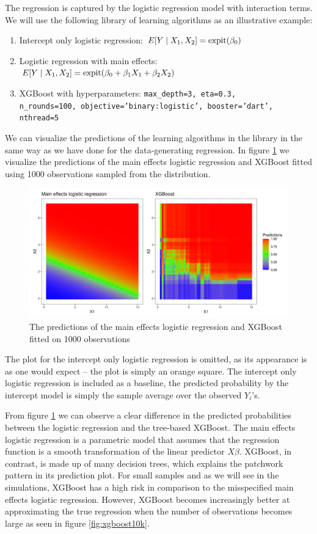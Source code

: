 \documentclass[./main.tex]{subfiles}
\begin{document}
The regression is captured by the logistic regression model with interaction terms. We will use the following library of learning algorithms as an illustrative example:
\begin{enumerate}
    \item Intercept only logistic regression: $E[Y \mid X_1, X_2] = \operatorname{expit}(\beta_0)$
    \item Logistic regression with main effects: $E[Y \mid X_1, X_2] = \operatorname{expit}(\beta_0 + \beta_1 X_1 + \beta_2 X_2)$
    \item XGBoost with hyperparameters: \texttt{max\_depth=3, eta=0.3,\\ n\_rounds=100, objective='binary:logistic', booster='dart', nthread=5}
\end{enumerate}
We can visualize the predictions of the learning algorithms in the library in the same way as we have done for the data-generating regression. In figure \ref{fig:predictpar} we visualize the predictions of the main effects logistic regression and XGBoost fitted using 1000 observations sampled from the distribution. 
\begin{figure}
    \centering
    \includegraphics[width=\textwidth]{figures/predictpar.png}
    \caption{The predictions of the main effects logistic regression and XGBoost fitted on 1000 observations}
    \label{fig:predictpar}
\end{figure}

The plot for the intercept only logistic regression is omitted, as its appearance is as one would expect -- the plot is simply an orange square. The intercept only logistic regression is included as a baseline, the predicted probability by the intercept model is simply the sample average over the observed $ Y_i$'s. 

From figure \ref{fig:predictpar} we can observe a clear difference in the predicted probabilities between the logistic regression and the tree-based XGBoost. The main effects logistic regression is a parametric model that assumes that the regression function is a smooth transformation of the linear predictor $ X\beta $. XGBoost, in contrast, is made up of many decision trees, which explains the patchwork pattern in its prediction plot. For small samples and as we will see in the simulations, XGBoost has a high risk in comparison to the misspecified main effects logistic regression. However, XGBoost becomes increasingly better at approximating the true regression when the number of observations becomes large as seen in figure \ref{fig:xgboost10k}. 
\end{document}
